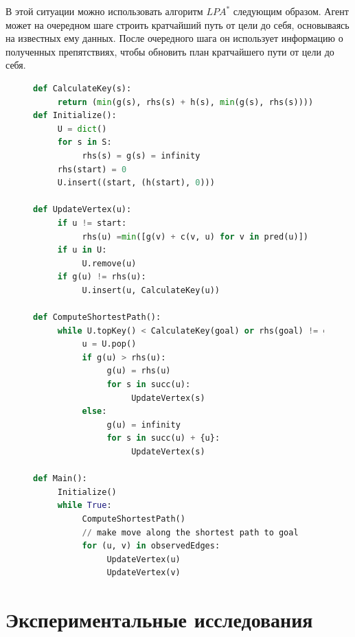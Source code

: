 \documentclass[11pt]{article}
\begin{document}
    В этой ситуации можно использовать алгоритм $LPA^*$ следующим образом.
    Агент может на очередном шаге строить кратчайший путь от цели до себя, основываясь на известных ему данных.
    После очередного шага он использует информацию о полученных препятствиях, чтобы обновить план кратчайшего пути от цели до себя.

    \begin{figure}
        \begin{lstlisting}[language=Python, caption=D* lite ]
def CalculateKey(s):
     return (min(g(s), rhs(s) + h(s), min(g(s), rhs(s))))
def Initialize():
     U = dict()
     for s in S:
          rhs(s) = g(s) = infinity
     rhs(start) = 0
     U.insert((start, (h(start), 0)))

def UpdateVertex(u):
     if u != start:
          rhs(u) =min([g(v) + c(v, u) for v in pred(u)])
     if u in U:
          U.remove(u)
     if g(u) != rhs(u):
          U.insert(u, CalculateKey(u))

def ComputeShortestPath():
     while U.topKey() < CalculateKey(goal) or rhs(goal) != g(goal):
          u = U.pop()
          if g(u) > rhs(u):
               g(u) = rhs(u)
               for s in succ(u):
                    UpdateVertex(s)
          else:
               g(u) = infinity
               for s in succ(u) + {u}:
                    UpdateVertex(s)

def Main():
     Initialize()
     while True:
          ComputeShortestPath()
          // make move along the shortest path to goal
          for (u, v) in observedEdges:
               UpdateVertex(u)
               UpdateVertex(v)
        \end{lstlisting}
    \end{figure}


    \section{Экспериментальные исследования}
\end{document}
